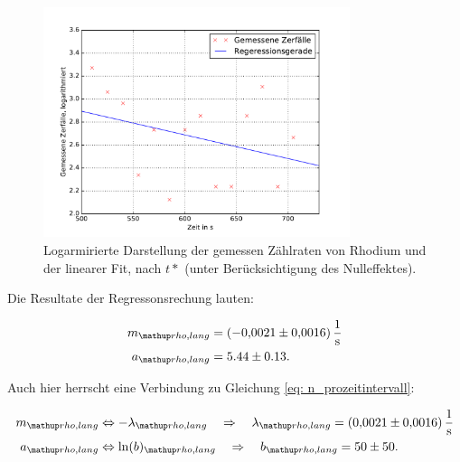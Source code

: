 \begin{figure}
  \centering
  \includegraphics[width=0.8\textwidth]{pics/rhodium_lang.pdf}
  \caption{Logarmirierte Darstellung der gemessen Zählraten von Rhodium und der linearer Fit, nach $t*$  (unter Berücksichtigung des Nulleffektes).}
  \label{fig: plot_rhodium_lang}
\end{figure}

Die Resultate der Regressonsrechung lauten:

\begin{align}
  \label{eq:parameter_rhodium_lang}
  \begin{aligned}
    m\ua{rho,lang}&=\SI{-0.0021\pm0.0016}{\per\second}\\
    a\ua{rho,lang}&=5.44\pm0.13.
  \end{aligned}
\end{align}


Auch hier herrscht eine Verbindung zu Gleichung \eqref{eq: n_prozeitintervall}:

\begin{align}
  \label{eq:parameter_rhodium_lang_lambda}
  \begin{aligned}
    m\ua{rho,lang}&\Leftrightarrow -\lambda\ua{rho,lang} \quad \Rightarrow \quad \lambda\ua{rho,lang}=\SI{0.0021\pm0.0016}{\per\second}\\
    a\ua{rho,lang}&\Leftrightarrow \ln(b)\ua{rho,lang} \quad \Rightarrow \quad b\ua{rho,lang} =50\pm 50.
  \end{aligned}
\end{align}
